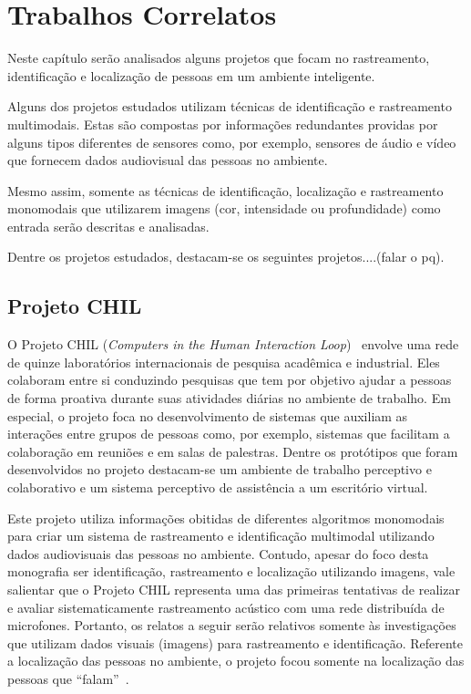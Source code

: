 \chapter{Trabalhos Correlatos}

Neste capítulo serão analisados alguns projetos que focam no rastreamento, identificação e localização de pessoas em um ambiente inteligente. 

Alguns dos projetos estudados utilizam técnicas de identificação e rastreamento multimodais. Estas são compostas por informações redundantes providas por alguns tipos diferentes de sensores como, por exemplo, sensores de áudio e vídeo que fornecem dados audiovisual  das pessoas no ambiente.

Mesmo assim, somente as técnicas de identificação, localização e rastreamento monomodais que utilizarem imagens (cor, intensidade ou profundidade) como entrada serão descritas e analisadas.

Dentre os projetos estudados, destacam-se os seguintes projetos....(falar o pq).

\section{Projeto CHIL}

O Projeto CHIL (\textit{Computers in the Human Interaction Loop})~\cite{chil, computerschil} envolve uma rede de quinze laboratórios internacionais de pesquisa acadêmica e industrial. Eles colaboram entre si conduzindo pesquisas que tem por objetivo ajudar a pessoas de forma proativa durante suas atividades diárias no ambiente de trabalho. Em especial, o projeto foca no desenvolvimento de sistemas que auxiliam as interações entre grupos de pessoas como, por exemplo, sistemas que facilitam a colaboração em reuniões e em salas de palestras. Dentre os protótipos que foram desenvolvidos no projeto destacam-se um ambiente de trabalho perceptivo e colaborativo e um sistema perceptivo de assistência a um escritório virtual.

Este projeto utiliza informações obitidas de diferentes algoritmos monomodais para criar um sistema de rastreamento e identificação multimodal utilizando dados audiovisuais das pessoas no ambiente. Contudo, apesar do foco desta monografia ser identificação, rastreamento e localização utilizando imagens, vale salientar que o Projeto CHIL representa uma das primeiras tentativas de realizar e avaliar sistematicamente rastreamento acústico com uma rede distribuída de microfones. Portanto, os relatos a seguir serão relativos somente às investigações que utilizam dados visuais (imagens) para rastreamento e identificação. Referente a localização das pessoas no ambiente, o projeto focou somente na localização das pessoas que ``falam''~\cite{speaker-localization}.

